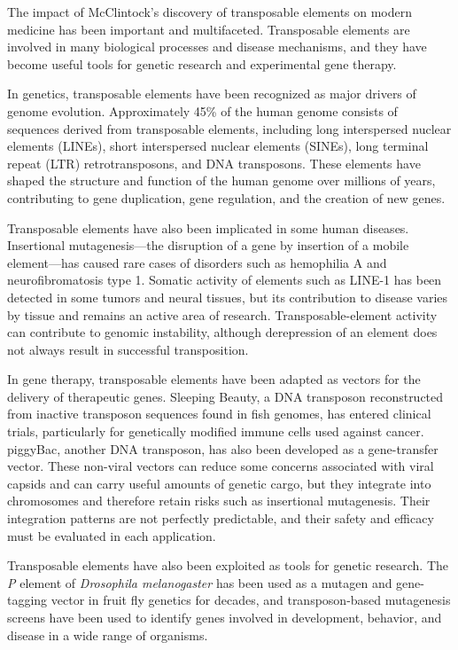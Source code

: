 The impact of McClintock's discovery of transposable elements on modern medicine has been important and multifaceted. Transposable elements are involved in many biological processes and disease mechanisms, and they have become useful tools for genetic research and experimental gene therapy.

In genetics, transposable elements have been recognized as major drivers of genome evolution. Approximately 45\% of the human genome consists of sequences derived from transposable elements, including long interspersed nuclear elements (LINEs), short interspersed nuclear elements (SINEs), long terminal repeat (LTR) retrotransposons, and DNA transposons. These elements have shaped the structure and function of the human genome over millions of years, contributing to gene duplication, gene regulation, and the creation of new genes.

Transposable elements have also been implicated in some human diseases. Insertional mutagenesis---the disruption of a gene by insertion of a mobile element---has caused rare cases of disorders such as hemophilia A and neurofibromatosis type 1. Somatic activity of elements such as LINE-1 has been detected in some tumors and neural tissues, but its contribution to disease varies by tissue and remains an active area of research. Transposable-element activity can contribute to genomic instability, although derepression of an element does not always result in successful transposition.

In gene therapy, transposable elements have been adapted as vectors for the delivery of therapeutic genes. Sleeping Beauty, a DNA transposon reconstructed from inactive transposon sequences found in fish genomes, has entered clinical trials, particularly for genetically modified immune cells used against cancer. piggyBac, another DNA transposon, has also been developed as a gene-transfer vector. These non-viral vectors can reduce some concerns associated with viral capsids and can carry useful amounts of genetic cargo, but they integrate into chromosomes and therefore retain risks such as insertional mutagenesis. Their integration patterns are not perfectly predictable, and their safety and efficacy must be evaluated in each application.

Transposable elements have also been exploited as tools for genetic research. The \emph{P} element of \emph{Drosophila melanogaster} has been used as a mutagen and gene-tagging vector in fruit fly genetics for decades, and transposon-based mutagenesis screens have been used to identify genes involved in development, behavior, and disease in a wide range of organisms.


